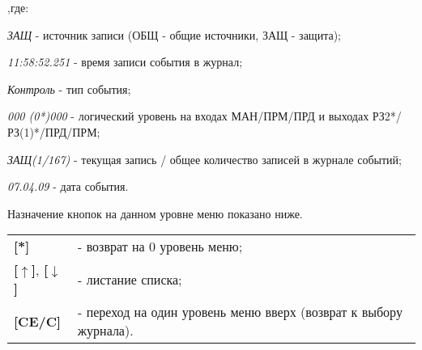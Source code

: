 \begin{ESKDexplanation}[1.5cm]
	\item[,где:]
	\item {\it ЗАЩ} - источник записи (ОБЩ - общие источники, ЗАЩ - защита);
	\item {\it 11:58:52.251} - время записи события в журнал;
	\item {\it Контроль} - тип события;
	\item {\it 000 (0*)000} - логический уровень на входах МАН/ПРМ/ПРД  и выходах РЗ2*/РЗ(1)*/ПРД/ПРМ;
	\item {\it ЗАЩ(1/167)} - текущая запись / общее количество записей в журнале событий;
	\item {\it 07.04.09} - дата события.
\end{ESKDexplanation}

Назначение кнопок на данном уровне меню показано ниже.
\begin{center}
	\begin{tabular}{p{2cm} p{15cm}}
		\textbf{[*]} 	& - возврат на 0 уровень меню; \tabularnewline
		\textbf{[$\uparrow$]}, \textbf{[$\downarrow$]}  & - листание списка; \tabularnewline
		\textbf{[CE/C]} & - переход на один уровень меню вверх (возврат к выбору журнала). \tabularnewline				
	\end{tabular}
\end{center} 